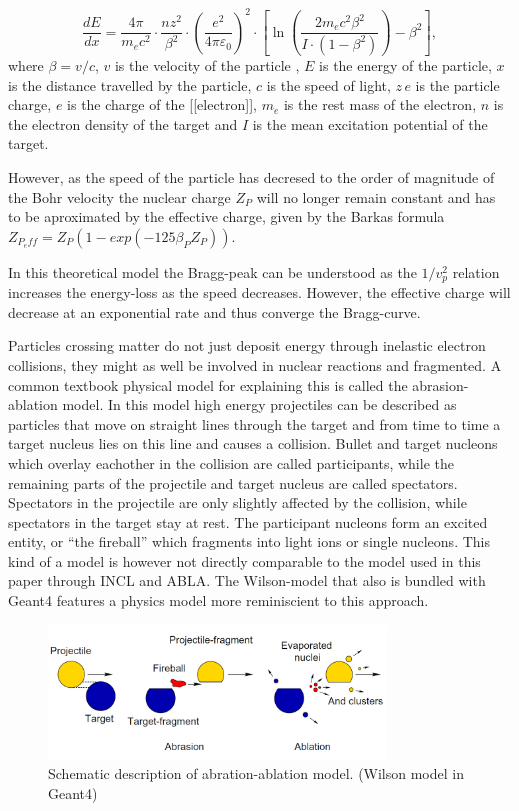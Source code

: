 \begin{equation}
 \frac{dE}{dx} = \frac{4 \pi}{m_e c^2} \cdot \frac{nz^2}{\beta^2} \cdot \left(\frac{e^2}{4\pi\varepsilon_0}\right)^2 \cdot \left[\ln \left(\frac{2m_e c^2 \beta^2}{I \cdot (1-\beta^2)}\right) - \beta^2\right],
\label{bethebloch}
\end{equation}
where $\beta = v/c $, 
$v$ is the velocity of the particle ,
$E$ is the 
energy of the particle,
$x$ is the 
distance travelled by the particle,
$c$ is the 
speed of light,
$z\,e$ is the 
particle charge,
$e$ is the 
charge of the [[electron]],
$m_e$  is the 
rest mass of the electron,
$n$ is the 
electron density of the target and 
$I$  is the 
mean excitation potential of the target.


However, as the speed of the particle has decresed to the order of magnitude of the Bohr velocity the nuclear charge $Z_P$ will no longer remain constant and has to be aproximated by the effective charge, given by the Barkas formula $Z_{P_eff} = Z_{P}(1-exp(-125\beta_{P}Z_{P}))$.

In this theoretical model the Bragg-peak can be understood as the $1/v_{p}^2$ relation increases the energy-loss as the speed decreases. However, the effective charge will decrease at an exponential rate and thus converge the Bragg-curve.

Particles crossing matter do not just deposit energy through inelastic electron collisions, they might as well be involved in nuclear reactions and fragmented. A common textbook physical model for explaining this is called the abrasion-ablation model. In this model high
energy projectiles can be described as particles that move on straight lines through the
target and from time to time a target nucleus lies on this line and causes a collision. Bullet
and target nucleons which overlay eachother in the collision are called participants,
while the remaining parts of the projectile and target nucleus are called spectators. Spectators in the projectile are only slightly affected by the collision, while spectators in the target stay at rest. The participant nucleons form an excited entity, or ``the fireball'' which fragments into light ions or single nucleons. This kind of a model is however not directly comparable to the model used in this paper through INCL and ABLA. The Wilson-model that also is bundled with Geant4 features a physics model more reminiscient to this approach.
\begin{figure}
\begin{center}
\includegraphics[width=0.8\textwidth]{images/ablationabration.png}  
\caption{Schematic description of abration-ablation model. (Wilson model in Geant4)}
 \label{fig:ablationabration}
 \end{center}
 \end{figure}



